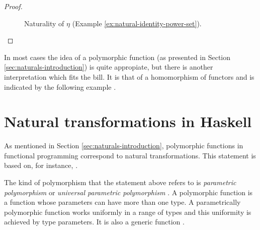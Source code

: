 \begin{example}
\begin{proof}
    \begin{figure}[htbp]
      \begin{center}
      \end{center}
      \caption{Naturality of $\eta$ (Example \ref{ex:natural-identity-power-set}).}
      \label{fig:naturality-eta}
    \end{figure}

  \end{proof}

\end{example}

In most cases the idea of a polymorphic function (as presented in
Section \ref{sec:naturals-introduction}) is quite appropiate, but
there is another interpretation which fits the bill. It is that of a
homomorphism of functors and is indicated by the following example
\parencite[page 436]{poigne-1992}.

\section{Natural transformations in Haskell}
\label{sec:naturals-haskell}


As mentioned in Section \ref{sec:naturals-introduction}, polymorphic
functions in functional programming correspond to natural
transformations. This statement is based on, for instance,
\parencites[34]{bird-demoor-1997}[78]{elkins-2009}[435, 436]{poigne-1992}[48,
  49]{rydeheard-1986}[113]{rydeheard-1988}[350]{wadler-1989}.

The kind of polymorphism that the statement above refers to is
\emph{parametric polymorphism}
\parencite[following][37]{strachey-2000} or \emph{universal parametric
  polymorphism} \parencite[following][4]{cardelli-1985}. A polymorphic
function is a function whose parameters can have more than one type. A
parametrically polymorphic function works uniformly in a range of
types and this uniformity is achieved by type parameters. It is also a
generic function \parencite[4, 5]{cardelli-1985}.

